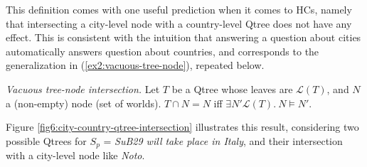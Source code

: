 This definition comes with one useful prediction when it comes to HCs, namely that intersecting a city-level node with a country-level Qtree does not have any effect. This is consistent with the intuition that answering a question about cities automatically answers question about countries, and corresponds to the generalization in (\ref{ex2:vacuous-tree-node}), repeated below.

\begin{exe}
	 {\textit{Vacuous tree-node intersection.} Let $T$ be a Qtree whose leaves are $\mathcal{L}(T)$, and $N$ a (non-empty) node (set of worlds). $T\cap N = N$ iff $\exists N' \mathcal{L}(T). \ N \vDash N'$.}
\end{exe}

Figure \ref{fig6:city-country-qtree-intersection} illustrates this result, considering two possible Qtrees for $S_p$ = \textit{SuB29 will take place in Italy}, and their intersection with a city-level node like \textit{Noto}.


